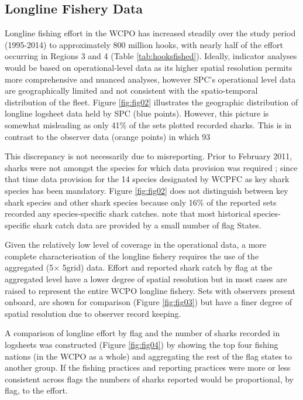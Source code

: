 \documentclass[12pt]{SCreport}
\begin{document}

\subsection{Longline Fishery Data}
  
Longline fishing effort in the WCPO has increased steadily over the study period (1995-2014) to approximately 800 million hooks, with nearly half of the effort occurring in Regions 3 and 4 (Table \ref{tab:hooksfished}).  Ideally, indicator analyses would be based on operational-level data as its higher spatial resolution permits more comprehensive and nuanced analyses, however SPC’s operational level data are geographically limited and not consistent with the spatio-temporal distribution of the fleet.  Figure \ref{fig:fig02} illustrates the geographic distribution of longline logsheet data held by SPC (blue points). However, this picture is somewhat misleading as only 41\% of the sets plotted recorded sharks. This is in contrast to the observer data (orange points) in which 93%

This discrepancy is not necessarily due to misreporting. Prior to February 2011, sharks were not amongst the species for which data provision was required \citep{WCPFC2011_a}; since that time data provision for the 14 species designated by WCPFC as key shark species has been mandatory. Figure \ref{fig:fig02} does not distinguish between key shark species and other shark species because only 16\% of the reported sets recorded any species-specific shark catches. \citet{Clarke2011_b} note that most historical species-specific shark catch data are provided by a small number of flag States.

Given the relatively low level of coverage in the operational data, a more complete characterisation of the longline fishery requires the use of the aggregated (5\degree $\times$ 5\degree grid) data. Effort and reported shark catch by flag at the aggregated level have a lower degree of spatial resolution but in most cases are raised to represent the entire WCPO longline fishery. Sets with observers present onboard, are shown for comparison (Figure \ref{fig:fig03}) but have a finer degree of spatial resolution due to observer record keeping. 

A comparison of longline effort by flag and the number of sharks recorded in logsheets was constructed (Figure \ref{fig:fig04}) by showing the top four fishing nations (in the WCPO as a whole) and aggregating the rest of the flag states to another group. If the fishing practices and reporting practices were more or less consistent across flags the numbers of sharks reported would be proportional, by flag, to the effort.
\end{document}
